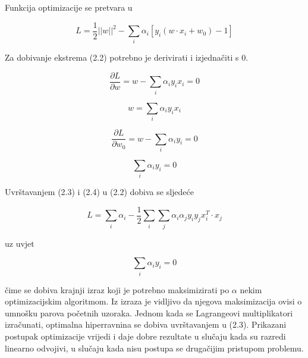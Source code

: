 \documentclass[times, utf8, zavrsni]{fer}
\begin{document}
Funkcija optimizacije se pretvara u

\begin{equation}
L = \frac{1}{2}\left| \left| w \right| \right|^2 - \sum_i \alpha_i \left[y_i \left(w \cdot x_i + w_0\right) - 1\right]
\end{equation}

Za dobivanje ekstrema (2.2) potrebno je derivirati i izjednačiti s 0.

\[
\frac{\partial L}{\partial w} = w - \sum_i \alpha_i y_i x_i = 0
\]

\begin{equation}
w = \sum_i \alpha_i y_i x_i
\end{equation}

\[
\frac{\partial L}{\partial w_0} = w - \sum_i \alpha_i y_i = 0
\]

\begin{equation}
\sum_i \alpha_i y_i = 0
\end{equation}

\bigbreak

Uvrštavanjem (2.3) i (2.4) u (2.2) dobiva se sljedeće

\begin{equation}
L = \sum_i \alpha_i - \frac{1}{2} \sum_i \sum_j \alpha_i \alpha_j y_i y_j x_i^T \cdot x_j
\end{equation}

uz uvjet

\[
\sum_i \alpha_i y_i = 0
\]

čime se dobiva krajnji izraz koji je potrebno maksimizirati po \(\alpha\) nekim optimizacijskim
algoritmom. Iz izraza je vidljivo da njegova maksimizacija ovisi o umnošku parova početnih uzoraka. 
Jednom kada se Lagrangeovi multiplikatori izračunati, optimalna hiperravnina se dobiva 
uvrštavanjem u (2.3). Prikazani postupak optimizacije vrijedi i daje dobre rezultate u slučaju 
kada su razredi linearno odvojivi, u slučaju kada nisu postupa se drugačijim pristupom problemu.
\end{document}
